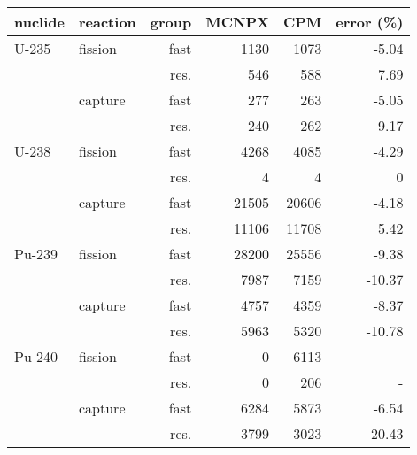 \documentclass{article}
\begin{document}
\footnotesize\begin{tabular}{llrrrr}\toprule
nuclide & reaction & group & MCNPX & CPM & error (\%)\\ 
\midrule
U-235 & fission & fast & 1130 & 1073 & -5.04\\ 
 &  & res. & 546 & 588 & 7.69\\ 
\cmidrule{2-6}
 & capture & fast & 277 & 263 & -5.05\\ 
 &  & res. & 240 & 262 & 9.17\\ 
\cmidrule{1-6}
U-238 & fission & fast & 4268 & 4085 & -4.29\\ 
 &  & res. & 4 & 4 & 0\\ 
\cmidrule{2-6}
 & capture & fast & 21505 & 20606 & -4.18\\ 
 &  & res. & 11106 & 11708 & 5.42\\ 
\cmidrule{1-6}
Pu-239 & fission & fast & 28200 & 25556 & -9.38\\ 
 &  & res. & 7987 & 7159 & -10.37\\ 
\cmidrule{2-6}
 & capture & fast & 4757 & 4359 & -8.37\\ 
 &  & res. & 5963 & 5320 & -10.78\\ 
\cmidrule{1-6}
Pu-240 & fission & fast & 0 & 6113 & -\\ 
 &  & res. & 0 & 206 & -\\ 
\cmidrule{2-6}
 & capture & fast & 6284 & 5873 & -6.54\\ 
 &  & res. & 3799 & 3023 & -20.43\\ 
\bottomrule\end{tabular}
\end{document}
